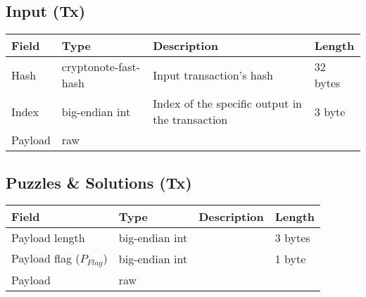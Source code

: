 \documentclass[a4paper,10pt]{article}
\begin{document}
        
        \subsection{Input (Tx)}
           \begin{tabularx}{\textwidth}{|l|l|X|l|}
            \hline Field & Type & Description & Length \\ \hline
            \hline Hash & cryptonote-fast-hash & Input transaction's hash & 32 bytes \\
            \hline Index & big-endian int & Index of the specific output in the transaction & 3 byte \\
            \hline Payload & raw & & \\
            \hline 
            \end{tabularx}
        
        
        \subsection{Puzzles \& Solutions (Tx)}
           \begin{tabularx}{\textwidth}{|l|l|X|l|}
            \hline Field & Type & Description & Length \\ \hline
            \hline Payload length & big-endian int &  & 3 bytes \\
            \hline Payload flag ($P_{Flag}$) & big-endian int &  & 1 byte \\
            \hline Payload & raw & & \\
            \hline
            \end{tabularx}
\end{document}

